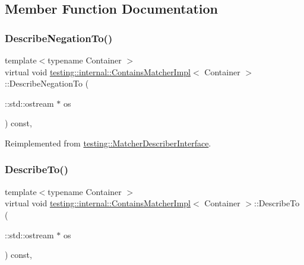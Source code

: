 \subsection{Member Function Documentation}
\mbox{\label{classtesting_1_1internal_1_1_contains_matcher_impl_a9d7867110ba3f346399f23e41cc75c5b}} 
\subsubsection{\texorpdfstring{Describe\+Negation\+To()}{DescribeNegationTo()}}
{\footnotesize\ttfamily template$<$typename Container $>$ \\
virtual void \hyperlink{classtesting_1_1internal_1_1_contains_matcher_impl}{testing\+::internal\+::\+Contains\+Matcher\+Impl}$<$ Container $>$\+::Describe\+Negation\+To (\begin{DoxyParamCaption}\item[{\+::std\+::ostream $\ast$}]{os }\end{DoxyParamCaption}) const\hspace{0.3cm}{\ttfamily [inline]}, {\ttfamily [virtual]}}



Reimplemented from \hyperlink{classtesting_1_1_matcher_describer_interface_a2071afbc47097c4d1c0064275af34db0}{testing\+::\+Matcher\+Describer\+Interface}.

\mbox{\label{classtesting_1_1internal_1_1_contains_matcher_impl_af47e4e9f890d64e7f8abcdf3f5fb8b3e}} 
\subsubsection{\texorpdfstring{Describe\+To()}{DescribeTo()}}
{\footnotesize\ttfamily template$<$typename Container $>$ \\
virtual void \hyperlink{classtesting_1_1internal_1_1_contains_matcher_impl}{testing\+::internal\+::\+Contains\+Matcher\+Impl}$<$ Container $>$\+::Describe\+To (\begin{DoxyParamCaption}\item[{\+::std\+::ostream $\ast$}]{os }\end{DoxyParamCaption}) const\hspace{0.3cm}{\ttfamily [inline]}, {\ttfamily [virtual]}}



